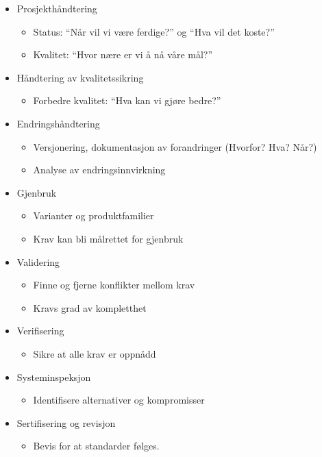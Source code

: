\begin{itemize}
\item
  Prosjekthåndtering
  \begin{itemize}
  \item
    Status: ``Når vil vi være ferdige?'' og ``Hva vil det koste?''
  \item
    Kvalitet: ``Hvor nære er vi å nå våre mål?''
  \end{itemize}
\item
  Håndtering av kvalitetssikring
  \begin{itemize}
  \item
    Forbedre kvalitet: ``Hva kan vi gjøre bedre?''
  \end{itemize}
\item
  Endringshåndtering
  \begin{itemize}
  \item
    Versjonering, dokumentasjon av forandringer (Hvorfor? Hva? Når?)
  \item
    Analyse av endringsinnvirkning
  \end{itemize}
\item
  Gjenbruk
  \begin{itemize}
  \item
    Varianter og produktfamilier
  \item
    Krav kan bli målrettet for gjenbruk
  \end{itemize}
\item
  Validering
  \begin{itemize}
  \item
    Finne og fjerne konflikter mellom krav
  \item
    Kravs grad av kompletthet
  \end{itemize}
\item
  Verifisering
  \begin{itemize}
  \item
    Sikre at alle krav er oppnådd
  \end{itemize}
\item
  Systeminspeksjon
  \begin{itemize}
  \item
    Identifisere alternativer og kompromisser
  \end{itemize}
\item
  Sertifisering og revisjon
  \begin{itemize}
  \item
    Bevis for at standarder følges.
  \end{itemize}
\end{itemize}
